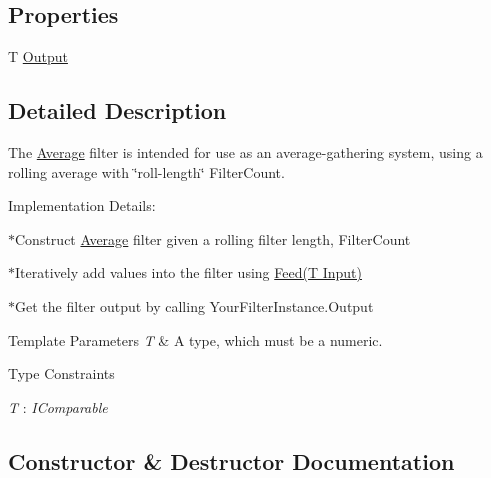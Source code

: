 \subsection*{Properties}
\begin{DoxyCompactItemize}
\item 
T \hyperlink{class_robotics_library_1_1_filters_1_1_average_aa59efec0916673c66b3507c4360c619e}{Output}
\end{DoxyCompactItemize}


\subsection{Detailed Description}
The \hyperlink{class_robotics_library_1_1_filters_1_1_average}{Average} filter is intended for use as an average-\/gathering system, using a rolling average with \char`\"{}roll-\/length\char`\"{} {\ttfamily Filter\+Count}.

Implementation Details\+:

$\ast$\+Construct \hyperlink{class_robotics_library_1_1_filters_1_1_average}{Average} filter given a rolling filter length, {\ttfamily Filter\+Count}

$\ast$\+Iteratively add values into the filter using {\ttfamily \hyperlink{class_robotics_library_1_1_filters_1_1_average_a27479a3706425bb721a7694acd388cdd}{Feed(\+T Input)}}

$\ast$\+Get the filter output by calling {\ttfamily Your\+Filter\+Instance.\+Output}


\begin{DoxyTemplParams}{Template Parameters}
{\em T} & A type, which must be a numeric.\\
\hline
\end{DoxyTemplParams}
\begin{Desc}
\item[Type Constraints]\begin{description}
\item[{\em T} : {\em I\+Comparable}]\end{description}
\end{Desc}


\subsection{Constructor \& Destructor Documentation}
\mbox{\label{class_robotics_library_1_1_filters_1_1_average_aa1f1ba91014e9fe0b966650b9ccbf514}} 
